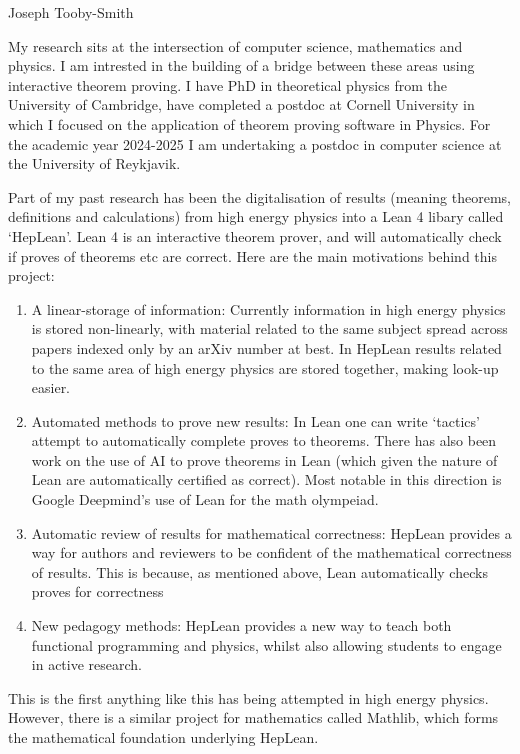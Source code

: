 \documentclass[12pt,letter]{article}
\newcounter{customtitle}
\begin{document}
\vspace{-1cm}
\begin{flushright}
{{\Large \color{white}Joseph Tooby-Smith }}
\end{flushright}
\vspace{0.4cm}

My research sits at the intersection of computer science, 
mathematics and physics.
I am intrested in the building of a bridge between these areas using 
interactive theorem proving. I have PhD in theoretical physics 
from the University of Cambridge, 
have completed a postdoc at Cornell University in which I focused on the 
application of theorem proving software in Physics. For the academic 
year 2024-2025 I am undertaking a postdoc in computer science at the 
University of Reykjavik.

Part of my past research has been the digitalisation of results (meaning theorems, definitions and calculations) from high energy physics into a Lean 4 libary called `HepLean'. Lean 4 is an interactive theorem prover, and will automatically check if proves of theorems etc are correct. Here are the main motivations behind this project:
\begin{enumerate}
\item A linear-storage of information: Currently information in high energy physics is stored non-linearly, with material related to the same subject spread across papers indexed only by an arXiv number at best. In HepLean results related to the same area of high energy physics are stored together, making look-up easier.
\item Automated methods to prove new results: In Lean one can write `tactics' attempt to automatically complete proves to theorems. There has also been work on the use of AI to prove theorems in Lean (which given the nature of Lean are automatically certified as correct). Most notable in this direction is Google Deepmind's use of Lean for the math olympeiad. 
\item Automatic review of results for mathematical correctness: HepLean provides a way for authors and reviewers to be confident of the mathematical correctness of results. This is because, as mentioned above, Lean automatically checks proves for correctness
\item New pedagogy methods:	HepLean provides a new way to teach both functional programming and physics, whilst also allowing students to engage in active research.
\end{enumerate}
 This is the first anything like this has being attempted
in high energy physics. However, there is a similar project for mathematics called Mathlib, which forms the mathematical foundation underlying HepLean.
\end{document}
